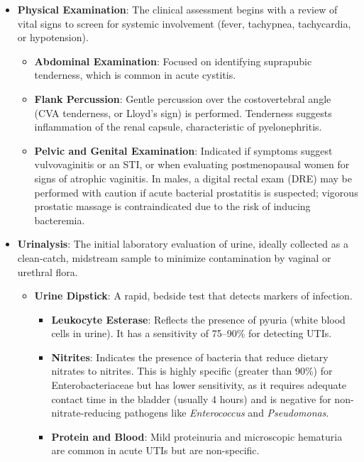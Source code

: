\begin{itemize}
    \item \textbf{Physical Examination}: The clinical assessment begins with a review of vital signs to screen for systemic involvement (fever, tachypnea, tachycardia, or hypotension).
    \begin{itemize}
        \item \textbf{Abdominal Examination}: Focused on identifying suprapubic tenderness, which is common in acute cystitis.
        \item \textbf{Flank Percussion}: Gentle percussion over the costovertebral angle (CVA tenderness, or Lloyd's sign) is performed. Tenderness suggests inflammation of the renal capsule, characteristic of pyelonephritis.
        \item \textbf{Pelvic and Genital Examination}: Indicated if symptoms suggest vulvovaginitis or an STI, or when evaluating postmenopausal women for signs of atrophic vaginitis. In males, a digital rectal exam (DRE) may be performed with caution if acute bacterial prostatitis is suspected; vigorous prostatic massage is contraindicated due to the risk of inducing bacteremia.
    \end{itemize}
    \item \textbf{Urinalysis}: The initial laboratory evaluation of urine, ideally collected as a clean-catch, midstream sample to minimize contamination by vaginal or urethral flora.
    \begin{itemize}
        \item \textbf{Urine Dipstick}: A rapid, bedside test that detects markers of infection.
        \begin{itemize}
            \item \textbf{Leukocyte Esterase}: Reflects the presence of pyuria (white blood cells in urine). It has a sensitivity of 75--90\% for detecting UTIs.
            \item \textbf{Nitrites}: Indicates the presence of bacteria that reduce dietary nitrates to nitrites. This is highly specific (greater than 90\%) for Enterobacteriaceae but has lower sensitivity, as it requires adequate contact time in the bladder (usually 4 hours) and is negative for non-nitrate-reducing pathogens like \textit{Enterococcus} and \textit{Pseudomonas}.
            \item \textbf{Protein and Blood}: Mild proteinuria and microscopic hematuria are common in acute UTIs but are non-specific.
        \end{itemize}

\end{itemize}
\end{itemize}
